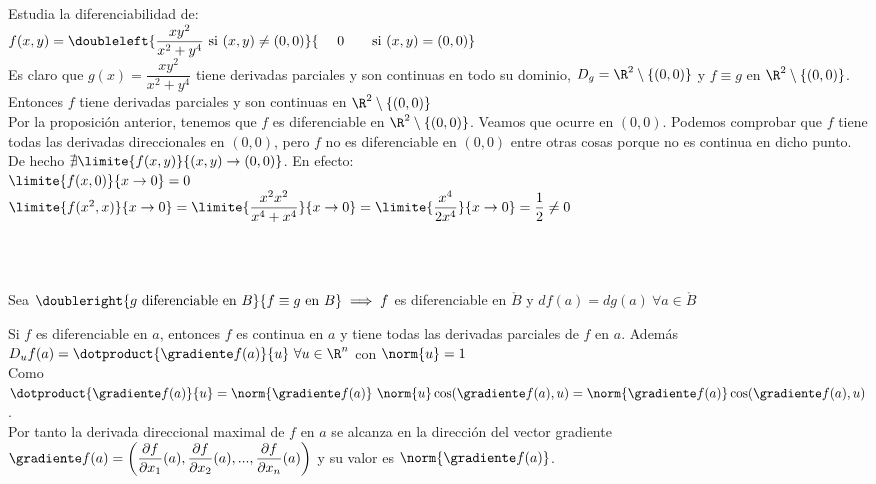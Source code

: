 	\begin{ejem} Estudia la diferenciabilidad de:\\
	$f(x,y)=\doubleleft{\dfrac{xy^2}{x^2+y^4}\mathrm{\ si\ }(x,y)\neq(0,0)}{\ \ \ \ 0\mathrm{\ \ \ \ \ \ si\ }(x,y)=(0,0)}$\\
	Es claro que $g(x)=\dfrac{xy^2}{x^2+y^4}$ tiene derivadas parciales y son continuas en todo su dominio, $D_g=\R^2\setminus\{(0,0)\}$ y $f\equiv g$ en $\R^2\setminus\{(0,0)\}$. Entonces $f$ tiene derivadas parciales y son continuas en $\R^2\setminus\{(0,0)\}$\\
	Por la proposición anterior, tenemos que $f$ es diferenciable en $\R^2\setminus\{(0,0)\}$. Veamos que ocurre en $(0,0)$. Podemos comprobar que $f$ tiene todas las derivadas direccionales en $(0,0)$, pero $f$ no es diferenciable en $(0,0)$ entre otras cosas porque no es continua en dicho punto.\\ De hecho $\nexists \limite{f(x,y)}{(x,y)\to(0,0)}$. En efecto:\\
	$\limite{f(x,0)}{x\to 0}=0$\\
	$\limite{f(x^2,x)}{x\to 0}=\limite{\dfrac{x^2x^2}{x^4+x^4}}{x\to 0}=\limite{\dfrac{x^4}{2x^4}}{x\to 0}=\dfrac{1}{2}\neq 0$
	\begin{figura}\ \\
	\begin{center}
	\end{center}
	\end{figura}
	\end{ejem}
	
	\begin{observacion}\ \\
	Sea $\doubleright{g\mathrm{\ diferenciable\ en \ }B}{f\equiv g\mathrm{\ en \ }B}\implies f$ es diferenciable en $\mathring{B}$ y $df(a)=dg(a)\ \forall a\in\mathring{B}$
	\end{observacion}
	
	\begin{observacion} Si $f$ es diferenciable en $a$, entonces $f$ es continua en $a$ y tiene todas las derivadas parciales de $f$ en $a$. Además $D_uf(a)=\dotproduct{\gradiente f(a)}{u}\ \forall u\in\R^n$ con $\norm{u}=1$\\
	Como $\dotproduct{\gradiente f(a)}{u}=\norm{\gradiente f(a)} \  \norm{u}\cos(\gradiente f(a),u)=\norm{\gradiente f(a)}\cos(\gradiente f(a),u)$.\\
	Por tanto la derivada direccional maximal de $f$ en $a$ se alcanza en la dirección del vector gradiente $\gradiente f(a)=\left(\dfrac{\partial f}{\partial x_1}(a),\dfrac{\partial f}{\partial x_2}(a),...,\dfrac{\partial f}{\partial x_n}(a)\right)$ y su valor es $\norm{\gradiente f(a)}$.
	\end{observacion}
	
